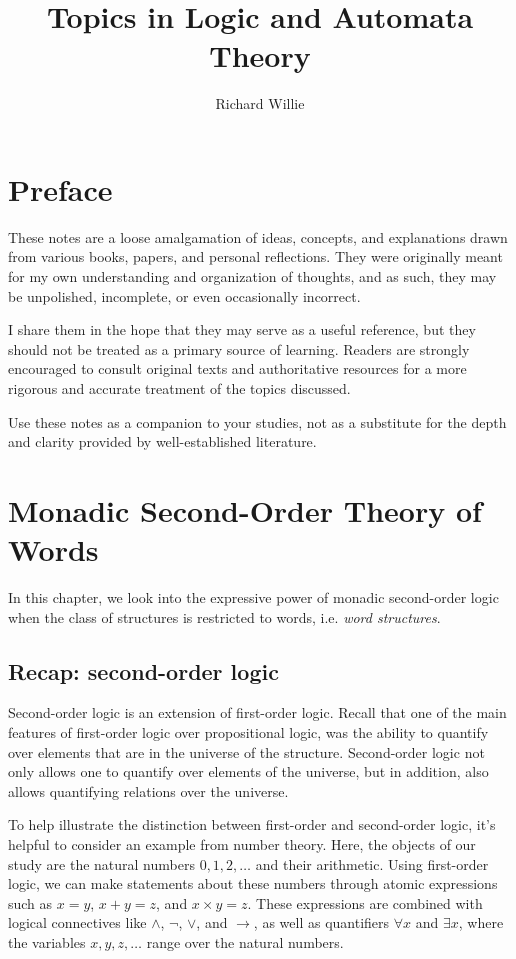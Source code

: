 \documentclass[11pt,twoside=off,numbers=noenddot]{scrbook}
\title{Topics in Logic and Automata Theory}
\author{Richard Willie}
\begin{document}
\maketitle

\chapter*{Preface}
These notes are a loose amalgamation of ideas, concepts, and explanations drawn from various books, papers, and personal reflections. They were originally meant for my own understanding and organization of thoughts, and as such, they may be unpolished, incomplete, or even occasionally incorrect.

I share them in the hope that they may serve as a useful reference, but they should not be treated as a primary source of learning. Readers are strongly encouraged to consult original texts and authoritative resources for a more rigorous and accurate treatment of the topics discussed.

Use these notes as a companion to your studies, not as a substitute for the depth and clarity provided by well-established literature.

\tableofcontents

\newpage

\chapter{Monadic Second-Order Theory of Words}
In this chapter, we look into the expressive power of monadic second-order logic when the class of structures is restricted to words, i.e. \emph{word structures}.

\section{Recap: second-order logic}
Second-order logic is an extension of first-order logic. Recall that one of the main features of first-order logic over propositional logic, was the ability to quantify over elements that are in the universe of the structure. Second-order logic not only allows one to quantify over elements of the universe, but in addition, also allows quantifying relations over the universe.

To help illustrate the distinction between first-order and second-order logic, it's helpful to consider an example from number theory. Here, the objects of our study are the natural numbers $0, 1, 2, \dots$ and their arithmetic. Using first-order logic, we can make statements about these numbers through atomic expressions such as $x = y$, $x + y = z$, and $x \times y = z$. These expressions are combined with logical connectives like $\wedge$, $\neg$, $\vee$, and $\rightarrow$, as well as quantifiers $\forall x$ and $\exists x$, where the variables $x, y, z, \dots$ range over the natural numbers.
\end{document}
